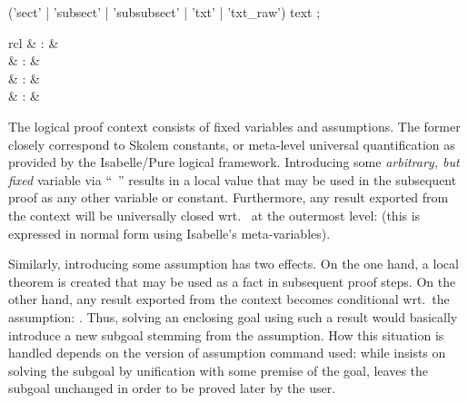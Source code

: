 \begin{isabellebody}
\begin{isamarkuptext}
  \begin{rail}
    ('sect' | 'subsect' | 'subsubsect' | 'txt' | 'txt\_raw') text
    ;
  \end{rail}%
\end{isamarkuptext}%
\isamarkuptrue%
%
\isamarkuptrue%
%
\begin{isamarkuptext}%
\begin{matharray}{rcl}
    \mbox{} & : &  \\
    \mbox{} & : &  \\
    \mbox{} & : &  \\
    \mbox{} & : &  \\
  \end{matharray}

  The logical proof context consists of fixed variables and
  assumptions.  The former closely correspond to Skolem constants, or
  meta-level universal quantification as provided by the Isabelle/Pure
  logical framework.  Introducing some \emph{arbitrary, but fixed}
  variable via ``\mbox{}~'' results in a local value
  that may be used in the subsequent proof as any other variable or
  constant.  Furthermore, any result  exported from
  the context will be universally closed wrt.\  at the
  outermost level:  (this is expressed in normal
  form using Isabelle's meta-variables).

  Similarly, introducing some assumption \isa{{\isasymchi}} has two effects.
  On the one hand, a local theorem is created that may be used as a
  fact in subsequent proof steps.  On the other hand, any result
  \isa{{\isachardoublequote}{\isasymchi}\ {\isasymturnstile}\ {\isasymphi}{\isachardoublequote}} exported from the context becomes conditional wrt.\
  the assumption: \isa{{\isachardoublequote}{\isasymturnstile}\ {\isasymchi}\ {\isasymLongrightarrow}\ {\isasymphi}{\isachardoublequote}}.  Thus, solving an enclosing goal
  using such a result would basically introduce a new subgoal stemming
  from the assumption.  How this situation is handled depends on the
  version of assumption command used: while \mbox{}
  insists on solving the subgoal by unification with some premise of
  the goal, \mbox{\isa{\isacommand{presume}}} leaves the subgoal unchanged in order
  to be proved later by the user.


\end{isamarkuptext}
\end{isabellebody}
